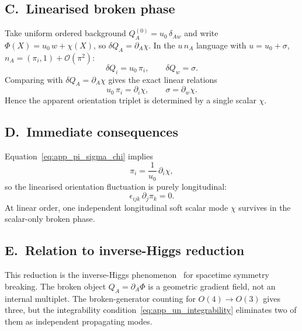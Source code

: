 \documentclass[11pt,a4paper]{article}
\numberwithin{equation}{section}
\begin{document}
\subsection*{C.\ Linearised broken phase}

Take uniform ordered background $Q_A^{(0)}=u_0\,\delta_{Aw}$ and write
$\Phi(X)=u_0\,w+\chi(X)$, so $\delta Q_A=\partial_A\chi$.
In the $u\,n_A$ language with $u=u_0+\sigma$,
$n_A=(\pi_i,1)+\mathcal{O}(\pi^2)$:
\begin{equation}
  \delta Q_i=u_0\,\pi_i, \qquad \delta Q_w=\sigma.
  \label{eq:app_deltaQ_components}
\end{equation}
Comparing with $\delta Q_A=\partial_A\chi$ gives the exact linear relations
\begin{equation}
  u_0\,\pi_i = \partial_i\chi, \qquad \sigma = \partial_w\chi.
  \label{eq:app_pi_sigma_chi}
\end{equation}
Hence the apparent orientation triplet is determined by a single scalar $\chi$.

\subsection*{D.\ Immediate consequences}

Equation~\eqref{eq:app_pi_sigma_chi} implies
\begin{equation}
  \pi_i = \frac{1}{u_0}\,\partial_i\chi,
  \label{eq:app_pi_gradchi}
\end{equation}
so the linearised orientation fluctuation is purely longitudinal:
\begin{equation}
  \epsilon_{ijk}\,\partial_j\pi_k = 0.
  \label{eq:app_no_vorticity}
\end{equation}
At linear order, one independent longitudinal soft scalar mode $\chi$
survives in the scalar-only broken phase.

\subsection*{E.\ Relation to inverse-Higgs reduction}

This reduction is the inverse-Higgs
phenomenon~\cite{Ivanov1975,McArthur2010} for spacetime symmetry
breaking.
The broken object $Q_A=\partial_A\Phi$ is a geometric gradient field,
not an internal multiplet.
The broken-generator counting for $O(4)\to O(3)$ gives three, but the
integrability condition~\eqref{eq:app_un_integrability} eliminates two of
them as independent propagating modes.
\end{document}
